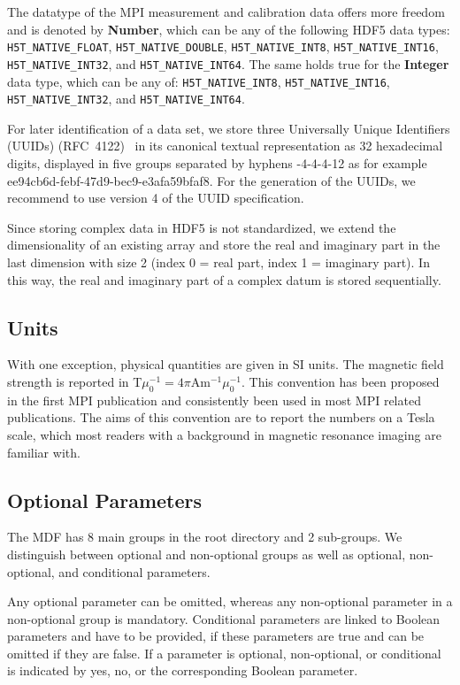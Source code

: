 \documentclass[landscape,a4paper]{article} %
\newcommand{\inl}[1]{\lstinline[columns=fixed]{#1}}
\newcommand{\inltab}[1]{{\ttfamily\bfseries\color{blue}#1}}
\newcommand{\inlvar}[1]{{\ttfamily#1}}
\begin{document}
\begin{multicols}{2}
The datatype of the MPI measurement and calibration data offers more freedom and is denoted by \inltab{Number}, which can be any of the following HDF5 data types: \inl{H5T_NATIVE_FLOAT}, \mbox{\inl{H5T_NATIVE_DOUBLE},} \inl{H5T_NATIVE_INT8}, \inl{H5T_NATIVE_INT16}, \inl{H5T_NATIVE_INT32}, and \inl{H5T_NATIVE_INT64}. The same holds true for the \inltab{Integer} data type, which can be any of: \inl{H5T_NATIVE_INT8}, \inl{H5T_NATIVE_INT16}, \inl{H5T_NATIVE_INT32}, and \inl{H5T_NATIVE_INT64}. 

For later identification of a data set, we store three Universally Unique Identifiers (UUIDs) (RFC~4122)~\cite{leach2005universally} in its canonical textual representation as 32 hexadecimal digits, displayed in five groups separated by hyphens \inlvar{8-4-4-4-12} as for example \inlvar{ee94cb6d-febf-47d9-bec9-e3afa59bfaf8}. For the generation of the UUIDs, we recommend to use version 4 of the UUID specification.

Since storing complex data in HDF5 is not standardized, we extend the dimensionality of an existing array and store the real and imaginary part in the last dimension with size 2 (index 0 = real part, index 1 = imaginary part). In this way, the real and imaginary part of a complex datum is stored sequentially.

\subsection{Units}

With one exception, physical quantities are given in SI units. The magnetic field strength is reported in T$\mu_0^{-1} = 4 \pi$Am$^{-1}\mu_0^{-1}$. This convention has been proposed in the first MPI publication \cite{Gleich2005} and consistently been used in most MPI related publications. The aims of this convention are to report the numbers on a Tesla scale, which most readers with a background in magnetic resonance imaging are familiar with.

\subsection{Optional Parameters}

The MDF has 8 main groups in the root directory and 2 sub-groups. We distinguish between optional and non-optional groups as well as optional, non-optional, and conditional parameters. 

Any optional parameter can be omitted, whereas any non-optional parameter in a non-optional group is mandatory. Conditional parameters are linked to Boolean parameters and have to be provided, if these parameters are true and can be omitted if they are false. If a parameter is optional, non-optional, or conditional is indicated by yes, no, or the corresponding Boolean parameter.


\end{multicols}
\end{document}
